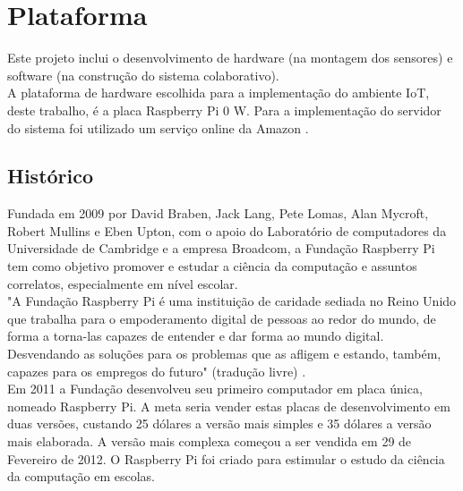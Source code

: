 \section{Plataforma}
\label{sec:plataforma}
\quad Este projeto inclui o desenvolvimento de hardware (na montagem dos sensores) e software (na construção do sistema colaborativo).
\\\null\quad A plataforma de hardware escolhida para a implementação do ambiente \acrlong{IoT}, deste trabalho, é a placa Raspberry Pi 0 W. Para a implementação do servidor do sistema foi utilizado um serviço online da Amazon \cite{lightsail}.
\subsection{Histórico}
\quad Fundada em 2009 por David Braben, Jack Lang, Pete Lomas, Alan Mycroft, Robert Mullins e Eben Upton, com o apoio do Laboratório de computadores da Universidade de Cambridge e a empresa Broadcom, a Fundação Raspberry Pi tem como objetivo promover e estudar a ciência da computação e assuntos correlatos, especialmente em nível escolar.
\\\null\quad "A Fundação Raspberry Pi é uma instituição de caridade sediada no Reino Unido que trabalha para o empoderamento digital de pessoas ao redor do mundo,
de forma a torna-las capazes de entender e dar forma ao mundo digital. Desvendando as soluções para os
problemas que as afligem e estando, também, capazes para os empregos do futuro" (tradução livre) \cite{rasp}.
\\\null \quad Em 2011 a Fundação desenvolveu seu primeiro computador em placa única, nomeado Raspberry Pi. A meta seria vender estas placas
de desenvolvimento em duas versões, custando 25 dólares a versão mais simples e 35 dólares a versão mais elaborada. A versão mais complexa começou a ser vendida
em 29 de Fevereiro de 2012. O Raspberry Pi foi criado para estimular o estudo da ciência da computação em escolas.

